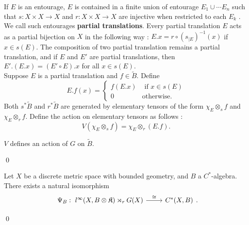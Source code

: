 If $E$ is an entourage, $E$ is contained in a finite union of entourage $E_1\cup \cdots E_n$ such that $s: X\times X \rightarrow X$ and $r: X\times X \rightarrow X$ are injective when restricted to each $E_k$ \cite{RoeCoarse}. We call such entourages \textbf{partial translations}. Every partial translation $E$ acts as a partial bijection on $X$ in the following way : $E.x = r\circ (s_{|E})^{-1}(x)$ if $x\in s(E)$. The composition of two partial translation remains a partial translation, and if $E$ and $E'$ are partial translations, then $E'.(E.x) = (E'\circ E).x$ for all $x\in s(E)$.\\

Suppose $E$ is a partial translation and $f\in\tilde B$. Define 
\[E.f(x) = \left\{\begin{array}{ll} f(E.x) & \text{ if }x\in s(E)\\ 0 & \text{otherwise.}\end{array}\right.\]
Both $s^* \tilde B$ and $r^* \tilde B$ are generated by elementary tensors of the form $\chi_E \otimes_s f$ and $\chi_E \otimes_r f$. Define the action on elementary tensors as follows :
\[V(\chi_E \otimes_s f) = \chi_E \otimes_r (E.f).\]

\begin{lem}
$V$ defines an action of $G$ on $\tilde B$.
\end{lem}

\begin{dem}
\qed
\end{dem}

\begin{thm}
Let $X$ be a discrete metric space with bounded geometry, and $B$ a $C^*$-algebra. There exists a natural isomorphism 
\[\begin{tikzcd}\Psi_B :  \ l^\infty(X,B\otimes\mathfrak K)\rtimes_r G(X) \arrow{r}{\cong} &   C^*(X,B)\end{tikzcd}.\] 
\end{thm}

\begin{dem}
\qed
\end{dem}
















 
